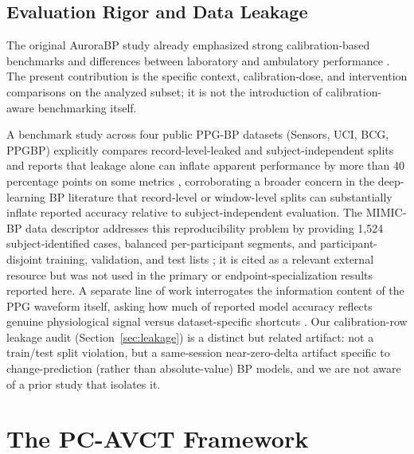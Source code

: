 \documentclass[journal]{IEEEtran}
\begin{document}
\subsection{Evaluation Rigor and Data Leakage}
The original AuroraBP study already emphasized strong calibration-based benchmarks and differences between laboratory and ambulatory performance \cite{aurorabp2022}. The present contribution is the specific context, calibration-dose, and intervention comparisons on the analyzed subset; it is not the introduction of calibration-aware benchmarking itself.

A benchmark study across four public PPG-BP datasets (Sensors, UCI, BCG, PPGBP) explicitly compares record-level-leaked and subject-independent splits and reports that leakage alone can inflate apparent performance by more than 40 percentage points on some metrics \cite{bpbenchmark2023}, corroborating a broader concern in the deep-learning BP literature that record-level or window-level splits can substantially inflate reported accuracy relative to subject-independent evaluation. The MIMIC-BP data descriptor addresses this reproducibility problem by providing 1{,}524 subject-identified cases, balanced per-participant segments, and participant-disjoint training, validation, and test lists \cite{mimicbp2024}; it is cited as a relevant external resource but was not used in the primary or endpoint-specialization results reported here. A separate line of work interrogates the information content of the PPG waveform itself, asking how much of reported model accuracy reflects genuine physiological signal versus dataset-specific shortcuts \cite{limitations2024,challenges2024}. Our calibration-row leakage audit (Section~\ref{sec:leakage}) is a distinct but related artifact: not a train/test split violation, but a same-session near-zero-delta artifact specific to change-prediction (rather than absolute-value) BP models, and we are not aware of a prior study that isolates it.
\section{The PC-AVCT Framework}
\label{sec:framework}
\end{document}

